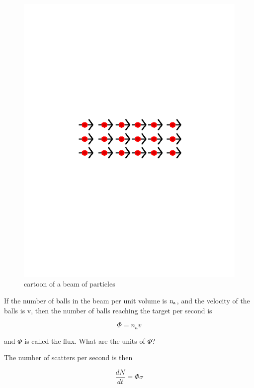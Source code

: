 \begin{figure}[h]
\centering\includegraphics[scale=0.5]{./protonprotoncollisions/Pictures/beam.pdf}
\caption{cartoon of a beam of particles}
\label{fig:beam}
\end{figure}



If the number of balls in the beam per unit volume is ${\rm n_a}$, 
and the velocity of the balls is v,  then the number of balls reaching the target per second is

\begin{equation}\Phi = n_{a}v\end{equation}

and \(\Phi\) is called the flux.  What are the units of \(\Phi\)?

The number of scatters per second is then

\begin{equation}\frac{dN}{dt}=\Phi \sigma
\end{equation}

